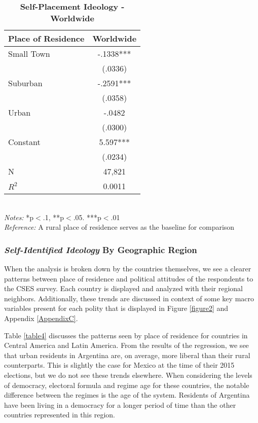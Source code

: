 \documentclass[12pt, titlepage]{article}
\newcommand\e{\emph}
\newcommand\tb{\textbf}
\begin{document}
\begin{singlespace}
	\begin{table}[H]
		\centering
		\caption{\tb{Self-Placement Ideology - Worldwide}}
		\begin{tabulary}{\linewidth}{l c}
			\\
			\hline
			\tb{Place of Residence}&\tb{Worldwide} \\
			\hline
			Small Town&-.1338***  \\    
			& (.0336)   \\
			Suburban & -.2591***\\ 
			& (.0358) \\
			Urban   & -.0482   \\
			& (.0300)    \\
			Constant   & 5.597***  \\
			&(.0234) \\
			N  & 47,821  \\
			$R^2$	& 0.0011 \\
			\hline                                       
		\end{tabulary}
		\\
		\e{Notes:} *p$<$.1, **p$<$.05. ***p$<$.01 \\
		\e{Reference:} A rural place of residence serves as the baseline for comparison
		\label{table3}
	\end{table}
\end{singlespace}

\subsubsection{\e{Self-Identified Ideology} By Geographic Region}

When the analysis is broken down by the countries themselves, we see a clearer patterns between place of residence and political attitudes of the respondents to the CSES survey. Each country is displayed and analyzed with their regional neighbors. Additionally, these trends are discussed in context of some key macro variables present for each polity that is displayed in Figure \ref{figure2} and Appendix \ref{AppendixC}.

Table \ref{table4} discusses the patterns seen by place of residence for countries in Central America and Latin America. From the results of the regression, we see that urban residents in Argentina are, on average, more liberal than their rural counterparts. This is slightly the case for Mexico at the time of their 2015 elections, but we do not see these trends elsewhere. When considering the levels of democracy, electoral formula and regime age for these countries, the notable difference between the regimes is the age of the system. Residents of Argentina have been living in a democracy for a longer period of time than the other countries represented in this region. 
\end{document}
